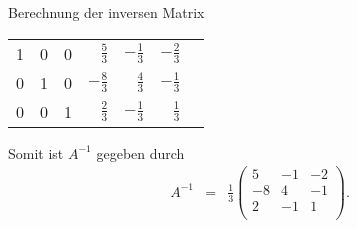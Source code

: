 \documentclass[german]{beamer}
\newcommand{\bq}{\begin{eqnarray*}}
\newcommand{\eq}{\end{eqnarray*}}
\begin{document}
\begin{frame}{Berechnung der inversen Matrix}

\begin{center}
\begin{tabular}{rrr|rrrl}
 1 &  0 &  0 & $\frac{5}{3}$ & $-\frac{1}{3}$ & $-\frac{2}{3}$ & \\
 0 &  1 &  0 & $-\frac{8}{3}$ & $\frac{4}{3}$ & $-\frac{1}{3}$ & \\
 0 &  0 &  1 & $\frac{2}{3}$ & $-\frac{1}{3}$ & $\frac{1}{3}$ & \\
\end{tabular}
\end{center}
Somit ist $A^{-1}$ gegeben durch
\bq
 A^{-1}
 & = &
 \frac{1}{3}
\left( \begin{array}{rrr}
 5 &  -1 &  -2 \\
 -8 &  4 &  -1 \\
 2 &  -1 &  1 \\
\end{array} \right).
\eq

\end{frame}


\begin{frame}

\end{frame}
\end{document}
